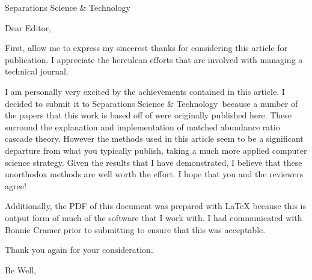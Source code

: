 \documentclass[12pt]{letter}
\date{\today}
\newcommand{\longinstname}{Separations Science \& Technology}
\begin{document}
\begin{letter}{Separations Science \& Technology}
                           
\opening{Dear Editor,}

First, allow me to express my sincerest thanks for considering this 
article for publication.  I appreciate the herculean efforts that 
are involved with managing a technical journal.

I am personally very excited by the achievements contained in this article.  
I decided to submit it to \longinstname\, because a number of the papers
that this work is based off of were originally published here.  These surround
the explanation and implementation of matched abundance ratio cascade theory.  
However the methods used in this article seem to be a significant departure 
from what you typically publish, taking a much more applied computer science 
strategy.  Given the results that I have demonstrated, I believe that these 
unorthodox methods are well worth the effort.  I hope that you and the reviewers 
agree!

Additionally, the PDF of this document was prepared with LaTeX because this is 
output form of much of the software that I work with.  I had communicated
with Bonnie Cramer prior to submitting to ensure that this was acceptable.

Thank you again for your consideration.

\closing{Be Well,\\
          \\
}

\end{letter}
\end{document}
